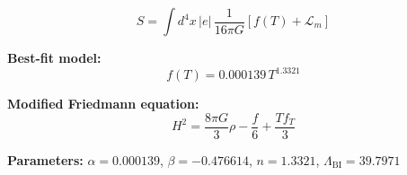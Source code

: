 
\begin{equation}
  S = \int d^4x \, |e| \, \frac{1}{16\pi G} \left[ f(T) + \mathcal{L}_m \right]
\end{equation}

\textbf{Best-fit model:}
\begin{equation}
  f(T) = 0.000139 \, T^{1.3321}
\end{equation}

\textbf{Modified Friedmann equation:}
\begin{equation}
  H^2 = \frac{8\pi G}{3} \rho - \frac{f}{6} + \frac{T f_T}{3}
\end{equation}

\textbf{Parameters:}
$\alpha = 0.000139$, \quad
$\beta = -0.476614$, \quad
$n = 1.3321$, \quad
$\Lambda_{\text{BI}} = 39.7971$